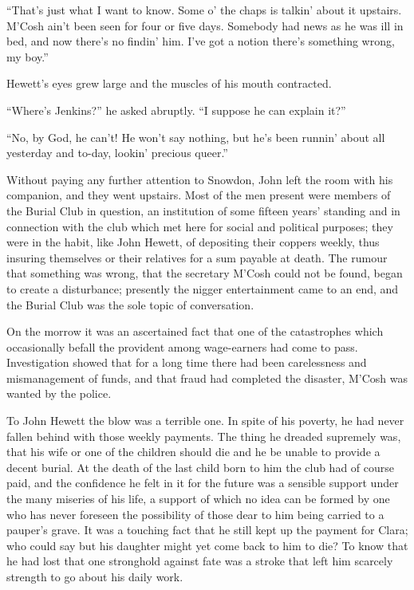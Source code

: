 ``That's just what I want to know. Some o' the chaps is talkin' about it
upstairs. M'Cosh ain't been seen for four or five days. Somebody had
news as he was ill in bed, and now there's no findin' him. I've got a
notion there's something wrong, my boy.''

{\protect\hypertarget{158}{}{}}Hewett's eyes grew large and the muscles
of his mouth contracted.

``Where's Jenkins?'' he asked abruptly. ``I suppose he can explain it?''

``No, by God, he can't! He won't say nothing, but he's been runnin'
about all yesterday and to-day, lookin' precious queer.''

Without paying any further attention to Snowdon, John left the room with
his companion, and they went upstairs. Most of the men present were
members of the Burial Club in question, an institution of some fifteen
years' standing and in connection with the club which met here for
social and political purposes; they were in the habit, like John Hewett,
of depositing their coppers weekly, thus insuring themselves or their
relatives for a sum payable at death. The rumour that something was
wrong, that the secretary M'Cosh could not be found, began to create a
disturbance; presently the nigger entertainment came to an end, and the
Burial Club was the sole topic of conversation.

On the morrow it was an ascertained fact
{\protect\hypertarget{159}{}{}}that one of the catastrophes which
occasionally befall the provident among wage-earners had come to pass.
Investigation showed that for a long time there had been carelessness
and mismanagement of funds, and that fraud had completed the disaster,
M'Cosh was wanted by the police.

To John Hewett the blow was a terrible one. In spite of his poverty, he
had never fallen behind with those weekly payments. The thing he dreaded
supremely was, that his wife or one of the children should die and he be
unable to provide a decent burial. At the death of the last child born
to him the club had of course paid, and the confidence he felt in it for
the future was a sensible support under the many miseries of his life, a
support of which no idea can be formed by one who has never foreseen the
possibility of those dear to him being carried to a pauper's grave. It
was a touching fact that he still kept up the payment for Clara; who
could say but his daughter might yet come back to him to die? To know
that he had lost that one stronghold
{\protect\hypertarget{160}{}{}}against fate was a stroke that left him
scarcely strength to go about his daily work.

